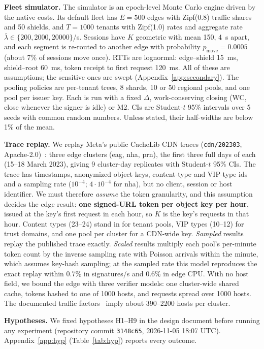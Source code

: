 \textbf{Fleet simulator.} The simulator is an epoch-level Monte Carlo engine driven by the native costs. Its default fleet has $E=500$ edges with Zipf(0.8) traffic shares and 50 shields, and $T=1000$ tenants with Zipf(1.0) rates and aggregate rate $\bar\lambda\in\{200,2000,\num{20000}\}$/s. Sessions have $K$ geometric with mean 150, 4~s apart, and each segment is re-routed to another edge with probability $p_{\text{move}}=0.0005$ (about 7\% of sessions move once). RTTs are lognormal: edge--shield 15~ms, shield--root 60~ms, token receipt to first request 120~ms. All of these are assumptions; the sensitive ones are swept (Appendix~\ref{app:secondary}). The pooling policies are per-tenant trees, 8 shards, 10 or 50 regional pools, and one pool per issuer key. Each is run with a fixed $\Delta$, work-conserving closing (WC, close whenever the signer is idle) or M2. CIs are Student-$t$ 95\% intervals over 5 seeds with common random numbers. Unless stated, their half-widths are below 1\% of the mean.

\textbf{Trace replay.} We replay Meta's public CacheLib CDN traces (\texttt{cdn/202303}, Apache-2.0)~\cite{berg2020cachelib,cachelib-traces}: three edge clusters (eag, nha, prn), the first three full days of each (15--18 March 2023), giving 9 cluster-day replicates with Student-$t$ 95\% CIs. The trace has timestamps, anonymized object keys, content-type and VIP-type ids and a sampling rate ($10^{-4}$; $4\cdot10^{-4}$ for nha), but no client, session or host identifier. We must therefore \emph{assume} the token granularity, and this assumption decides the edge result: \textbf{one signed-URL token per object key per hour}, issued at the key's first request in each hour, so $K$ is the key's requests in that hour. Content types (23--24) stand in for tenant pools, VIP types (10--12) for trust domains, and one pool per cluster for a CDN-wide key. \emph{Sampled} results replay the published trace exactly. \emph{Scaled} results multiply each pool's per-minute token count by the inverse sampling rate with Poisson arrivals within the minute, which assumes key-hash sampling; at the sampled rate this model reproduces the exact replay within 0.7\% in signatures/s and 0.6\% in edge CPU. With no host field, we bound the edge with three verifier models: one cluster-wide shared cache, tokens hashed to one of 1000 hosts, and requests spread over 1000 hosts. The documented traffic factors~\cite{cachelib-traces} imply about 390--\num{2200} hosts per cluster.

\textbf{Hypotheses.} We fixed hypotheses H1--H9 in the design document before running any experiment (repository commit \texttt{3148c65}, 2026-11-05 18:07 UTC). Appendix~\ref{app:hyp} (Table~\ref{tab:hyp}) reports every outcome.
